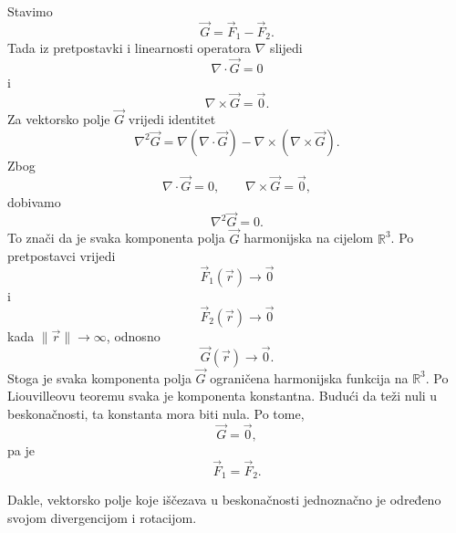 \documentclass[12pt,a4paper]{article}
\makeatletter
\renewenvironment{proof}[1][\proofname]{\par
  \pushQED{\qed}%
  \normalfont
  \topsep6\p@\@plus6\p@\relax
  \trivlist
  \item[\hskip\labelsep
  \bfseries #1\@addpunct{.}]\ignorespaces
}{%
  \popQED\endtrivlist\@endpefalse
}
\makeatother
\begin{document}
\begin{proof}
     Stavimo
$$ \overrightarrow{G}=\overrightarrow{F}_1-\overrightarrow{F}_2. $$
Tada iz pretpostavki i linearnosti operatora $\nabla$ slijedi
$$ \nabla\cdot\overrightarrow{G}=0 $$
i
$$ \nabla\times\overrightarrow{G}=\overrightarrow{0}. $$
Za vektorsko polje \(\overrightarrow{G}\) vrijedi identitet
$$ \nabla^2\overrightarrow{G} = \nabla(\nabla\cdot\overrightarrow{G}) - \nabla\times(\nabla\times\overrightarrow{G}). $$
Zbog
$$ \nabla\cdot\overrightarrow{G}=0, \qquad \nabla\times\overrightarrow{G}=\overrightarrow{0}, $$
dobivamo
$$ \nabla^2\overrightarrow{G}=0. $$
To znači da je svaka komponenta polja \(\overrightarrow{G}\) harmonijska na cijelom \(\mathbb{R}^3\). Po pretpostavci vrijedi
$$ \overrightarrow{F}_1(\overrightarrow{r})\to\overrightarrow{0} $$
i
$$ \overrightarrow{F}_2(\overrightarrow{r})\to\overrightarrow{0} $$
kada \(\|\overrightarrow{r}\|\to\infty\), odnosno
$$ \overrightarrow{G}(\overrightarrow{r})\to\overrightarrow{0}. $$
Stoga je svaka komponenta polja \(\overrightarrow{G}\) ograničena harmonijska funkcija na \(\mathbb{R}^3\). Po Liouvilleovu teoremu svaka je komponenta konstantna. Budući da teži nuli u beskonačnosti, ta konstanta mora biti nula. Po tome,
$$ \overrightarrow{G}=\overrightarrow{0}, $$
pa je
$$ \overrightarrow{F}_1=\overrightarrow{F}_2. $$
\end{proof}

Dakle, vektorsko polje koje iščezava u beskonačnosti jednoznačno je određeno svojom divergencijom i rotacijom.
\end{document}
